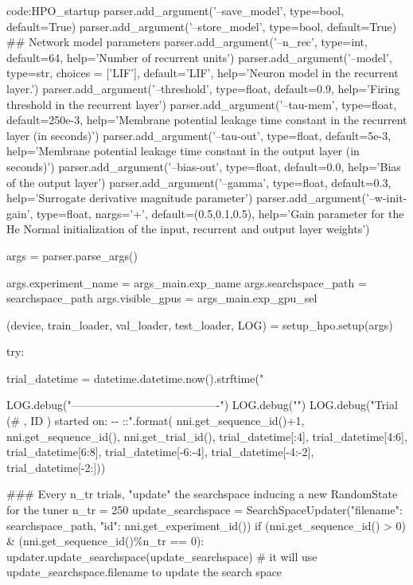 \begin{mycodebox}{code:HPO_startup}
    parser.add_argument('--save_model', type=bool, default=True)
    parser.add_argument('--store_model', type=bool, default=True)
    ## Network model parameters
    parser.add_argument('--n_rec', type=int, default=64, help='Number of recurrent units')
    parser.add_argument('--model', type=str, choices = ['LIF'], default='LIF', help='Neuron model in the recurrent layer.')
    parser.add_argument('--threshold', type=float, default=0.9, help='Firing threshold in the recurrent layer')
    parser.add_argument('--tau-mem', type=float, default=250e-3, help='Membrane potential leakage time constant in the recurrent layer (in seconds)')
    parser.add_argument('--tau-out', type=float, default=5e-3, help='Membrane potential leakage time constant in the output layer (in seconds)')
    parser.add_argument('--bias-out', type=float, default=0.0, help='Bias of the output layer')
    parser.add_argument('--gamma', type=float, default=0.3, help='Surrogate derivative magnitude parameter')
    parser.add_argument('--w-init-gain', type=float, nargs='+', default=(0.5,0.1,0.5), help='Gain parameter for the He Normal initialization of the input, recurrent and output layer weights')
    
    args = parser.parse_args()

    args.experiment_name = args_main.exp_name
    args.searchspace_path = searchspace_path
    args.visible_gpus = args_main.exp_gpu_sel

    (device, train_loader, val_loader, test_loader, LOG) = setup_hpo.setup(args)

    try:

        trial_datetime = datetime.datetime.now().strftime("%

        LOG.debug("----------------------------------------")
        LOG.debug("\n")
        LOG.debug("Trial {} (# {}, ID {}) started on: {}-{}-{} {}:{}:{}\n".format(
            nni.get_sequence_id()+1,
            nni.get_sequence_id(),
            nni.get_trial_id(),
            trial_datetime[:4],
            trial_datetime[4:6],
            trial_datetime[6:8],
            trial_datetime[-6:-4],
            trial_datetime[-4:-2],
            trial_datetime[-2:]))
    
        ### Every n_tr trials, "update" the searchspace inducing a new RandomState for the tuner
        n_tr = 250
        update_searchspace = SearchSpaceUpdater({"filename": searchspace_path, "id": nni.get_experiment_id()})
        if (nni.get_sequence_id() > 0) & (nni.get_sequence_id()\%n_tr == 0):
            updater.update_searchspace(update_searchspace) # it will use update_searchspace.filename to update the search space
        

\end{mycodebox}
